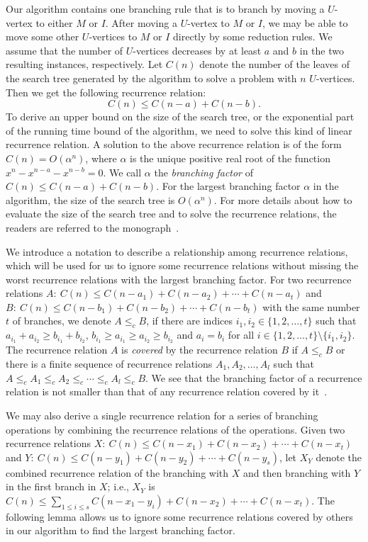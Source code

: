 \documentclass{elsart_TR2}
\begin{document}
Our algorithm contains one branching rule that is to branch by moving a $U$-vertex to either $M$ or $I$.
After  moving a $U$-vertex to $M$ or $I$, we may be able
to move some other $U$-vertices to $M$ or $I$ directly by some reduction rules.
We assume that the number of $U$-vertices decreases by at least $a$ and $b$ in the two resulting instances, respectively. Let $C(n)$ denote the number of the leaves of the search tree generated by the algorithm to solve a problem with $n$ $U$-vertices. Then we get the following recurrence relation:
$$C(n)\leq C(n-a)+C(n-b).$$
To derive an upper bound on the size of the search tree, or the exponential part of the running time bound of the algorithm, we need to solve
this kind of linear recurrence relation.
A solution to the above recurrence relation is of the form $C(n)=O(\alpha^n)$, where $\alpha$ is the unique positive real root of the function $x^n-x^{n-a}-x^{n-b}=0$.
We call $\alpha$ the \emph{branching factor} of $C(n)\leq C(n-a)+C(n-b)$.
For the largest branching factor  $\alpha$ in the algorithm,
 the size of the search tree is $O(\alpha ^n)$.
For more details about how to  evaluate the size of the search tree and to solve the recurrence relations,
the readers are referred to the monograph~\cite{Fomin:book}.




We introduce a notation to describe a relationship among  recurrence relations, which will be used for us to ignore some recurrence relations without missing the worst recurrence relations with the largest branching factor.
 For two  recurrence relations
$A:~C(n)\leq C(n-a_1)+C(n-a_2)+\cdots+ C(n-a_t)$ and
$B:~C(n)\leq C(n-b_1)+C(n-b_2)+\cdots+ C(n-b_t)$ with the same number $t$ of branches,
we denote $A\leq_c B$,
if
there are indices $i_1,i_2\in \{1,2,\ldots,t\}$ such that $a_{i_1}+a_{i_2}\geq b_{i_1}+b_{i_2}$, $b_{i_1}\geq a_{i_1}\geq a_{i_2} \geq b_{i_2}$ and $a_i=b_i$ for
all $i\in \{1,2,\ldots,t\}\setminus \{i_1,i_2\}$.
The recurrence relation $A$ is \emph{covered} by the recurrence relation $B$ if $A\leq_c B$ or there is a finite sequence of recurrence relations
$A_1,A_2,\ldots, A_l$ such that
$A \leq_c A_1 \leq_c A_2 \leq_c \cdots \leq_c A_l \leq_c B$.
We see that the branching factor of a recurrence relation is not smaller than that of any recurrence relation covered by it~\cite{Fomin:book}.

We may also derive a single recurrence relation for a series of branching operations
by combining the recurrence relations of the operations.
Given two recurrence relations
$X:~C(n)\leq C(n-x_1)+C(n-x_2)+\cdots+ C(n-x_t)$ and
$Y:~C(n)\leq C(n-y_1)+C(n-y_2)+\cdots+ C(n-y_s)$,
let  $X_Y$ denote
the combined recurrence relation of the branching with $X$ and then
branching with $Y$ in the first branch in $X$;
 i.e., $X_Y$ is $C(n)\leq \sum_{1\leq i\leq s}C(n-x_1-y_i)+C(n-x_2)+\cdots+ C(n-x_t)$.
The following lemma allows us to ignore some recurrence relations covered
by others in our algorithm to find the largest branching factor.
\end{document}

